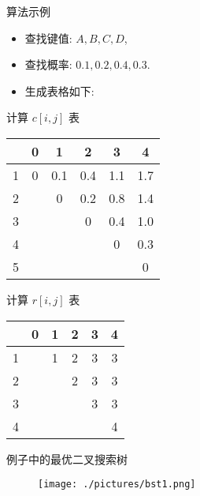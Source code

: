 \documentclass[fontset=fandol,UTF8,fleqn]{beamer}
\begin{document}
\begin{frame}{算法示例}
\begin{itemize}
\item 查找键值: $A, B, C, D$,
\item 查找概率: $0.1, 0.2, 0.4, 0.3$.
\item 生成表格如下:
\end{itemize}
\end{frame}

\begin{frame}{计算 $c[i,j]$ 表}
\begin{table}
  \centering
\Large{
  \begin{tabular}{|l|ccccc|}
\hline
     & 0 & 1 & 2 & 3 & 4 \\
\hline
1 & 0 & 0.1 & 0.4 & 1.1 & 1.7  \\
2  & & 0 & 0.2 & 0.8 & 1.4 \\
3 & & & 0 & 0.4 & 1.0  \\
4 & & & & 0 & 0.3  \\
5 &  &  & & & 0  \\
\hline
  \end{tabular}
}
\end{table}
\end{frame}

\begin{frame}{计算 $r[i,j]$ 表}
\begin{table}
  \centering
\Large{
  \begin{tabular}{|l|ccccc|}
\hline
    &   0 & 1 & 2 & 3 & 4\\
\hline
1  & & 1 & 2 & 3  & 3  \\
2  &  &  & 2 & 3 & 3  \\
3 &  & &  & 3 & 3   \\
4 &  & & &  & 4  \\
\hline
  \end{tabular}
}
\end{table}
\end{frame}

\begin{frame}{例子中的最优二叉搜索树}
\begin{figure}
  \centering
  \texttt{[image: ./pictures/bst1.png]}%
\end{figure}
\end{frame}
\end{document}
